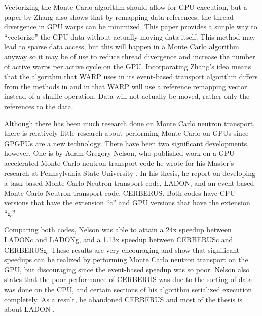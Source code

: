 
Vectorizing the Monte Carlo algorithm should allow for GPU execution, but a paper by Zhang \cite{on_the_fly_remapping} also shows that by remapping data references, the thread divergence in GPU warps can be minimized.  This paper provides a simple way to ``vectorize'' the GPU data without actually moving data itself.  This method may lead to sparse data access, but this will happen in a Monte Carlo algorithm anyway so it may be of use to reduce thread divergence and increase the number of active warps per active cycle on the GPU.  Incorporating Zhang's idea means that the algorithm that WARP uses in its event-based transport algorithm differs from the methods in \cite{vector} and\cite{vujic_vector} in that WARP will use a reference remapping vector instead of a shuffle operation.  Data will not actually be moved, rather only the references to the data. 

Although there has been much research done on Monte Carlo neutron transport, there is relatively little research about performing Monte Carlo on GPUs since GPGPUs are a new technology.  There have been two significant developments, however.  One is by Adam Gregory Nelson, who published work on a GPU accelerated Monte Carlo neutron transport code he wrote for his Master's research at Pennsylvania State University \cite{nelson}.  In his thesis, he report on developing a task-based Monte Carlo Neutron transport code, LADON, and an event-based Monte Carlo Neutron transport code, CERBERUS.  Both codes have CPU versions that have the extension ``c'' and GPU versions that have the extension ``g.''  

Comparing both codes, Nelson was able to attain a 24x speedup between LADONc and LADONg, and a 1.13x speedup between CERBERUSc and CERBERUSg.  These results are very encouraging and show that significant speedups can be realized by performing Monte Carlo neutron transport on the GPU, but discouraging since the event-based speedup was so poor.  Nelson also states that the poor performance of CERBERUS was due to the sorting of data was done on the CPU, and certain sections of his algorithm serialized execution completely.  As a result, he abandoned CERBERUS and most of the thesis is about LADON \cite{nelson}.  

